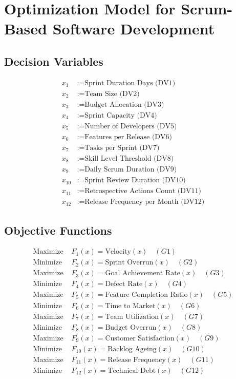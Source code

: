 \documentclass{article}
\begin{document}
\section*{Optimization Model for Scrum-Based Software Development}

\subsection*{Decision Variables}
\begin{align*}
x_1 &:= \text{Sprint Duration Days (DV1)} \\
x_2 &:= \text{Team Size (DV2)} \\
x_3 &:= \text{Budget Allocation (DV3)} \\
x_4 &:= \text{Sprint Capacity (DV4)} \\
x_5 &:= \text{Number of Developers (DV5)} \\
x_6 &:= \text{Features per Release (DV6)} \\
x_7 &:= \text{Tasks per Sprint (DV7)} \\
x_8 &:= \text{Skill Level Threshold (DV8)} \\
x_9 &:= \text{Daily Scrum Duration (DV9)} \\
x_{10} &:= \text{Sprint Review Duration (DV10)} \\
x_{11} &:= \text{Retrospective Actions Count (DV11)} \\
x_{12} &:= \text{Release Frequency per Month (DV12)} 
\end{align*}

\subsection*{Objective Functions}
\begin{align*}
\text{Maximize } &F_1(x) = \text{Velocity}(x) \quad (G1) \\
\text{Minimize } &F_2(x) = \text{Sprint Overrun}(x) \quad (G2) \\
\text{Maximize } &F_3(x) = \text{Goal Achievement Rate}(x) \quad (G3) \\
\text{Minimize } &F_4(x) = \text{Defect Rate}(x) \quad (G4) \\
\text{Maximize } &F_5(x) = \text{Feature Completion Ratio}(x) \quad (G5) \\
\text{Minimize } &F_6(x) = \text{Time to Market}(x) \quad (G6) \\
\text{Maximize } &F_7(x) = \text{Team Utilization}(x) \quad (G7) \\
\text{Minimize } &F_8(x) = \text{Budget Overrun}(x) \quad (G8) \\
\text{Maximize } &F_9(x) = \text{Customer Satisfaction}(x) \quad (G9) \\
\text{Minimize } &F_{10}(x) = \text{Backlog Ageing}(x) \quad (G10) \\
\text{Maximize } &F_{11}(x) = \text{Release Frequency}(x) \quad (G11) \\
\text{Minimize } &F_{12}(x) = \text{Technical Debt}(x) \quad (G12)
\end{align*}
\end{document}

